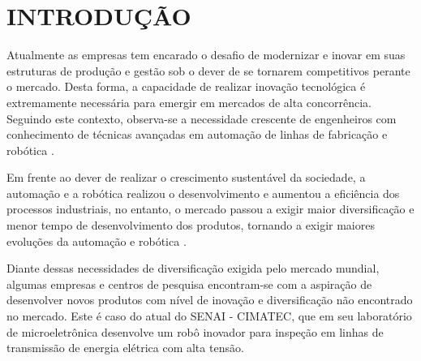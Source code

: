 \documentclass[12pt,oneside,a4paper, chapter=TITLE, section = TITLE, english, brazil]{abntex2}
\begin{document}


\textual

\chapter{INTRODUÇÃO} %

Atualmente as empresas tem encarado o desafio de modernizar e inovar em suas estruturas de produção e gestão sob o dever de se tornarem competitivos perante o mercado. Desta forma, a capacidade de realizar inovação tecnológica é extremamente necessária para emergir em mercados de alta concorrência. Seguindo este contexto, observa-se a necessidade crescente de engenheiros com conhecimento de técnicas avançadas em automação de linhas de fabricação e robótica \cite{rosario}.

Em frente ao dever de realizar o crescimento sustentável da sociedade, a automação e a robótica realizou o desenvolvimento e aumentou a eficiência dos processos industriais, no entanto, o mercado passou a exigir maior diversificação e menor tempo de desenvolvimento dos produtos, tornando a exigir maiores evoluções da automação e robótica \cite{rosario}.

Diante dessas necessidades de diversificação exigida pelo mercado mundial, algumas empresas e centros de pesquisa encontram-se com a aspiração de desenvolver novos produtos com nível de inovação e diversificação não encontrado no mercado. Este é caso do atual do SENAI - CIMATEC, que em seu laboratório de microeletrônica desenvolve um robô inovador para inspeção em linhas de transmissão de energia elétrica com alta tensão.
\end{document}
